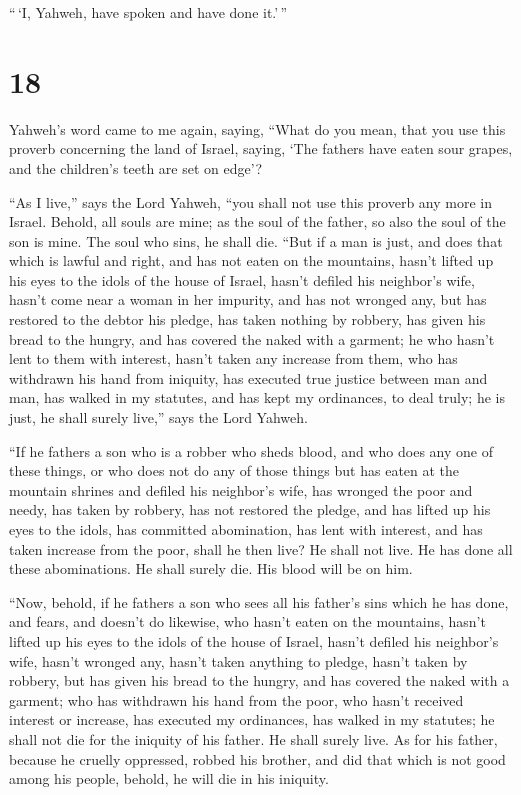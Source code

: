 ``\,`I, Yahweh, have spoken and have done it.'\,''

\hypertarget{section-17}{%
\section{18}\label{section-17}}

 Yahweh's word came to me again, saying, 
``What do you mean, that you use this proverb concerning the land of
Israel, saying, `The fathers have eaten sour grapes, and the children's
teeth are set on edge'?

 ``As I live,'' says the Lord Yahweh, ``you shall not use
this proverb any more in Israel.  Behold, all souls are
mine; as the soul of the father, so also the soul of the son is mine.
The soul who sins, he shall die.  ``But if a man is just,
and does that which is lawful and right,  and has not
eaten on the mountains, hasn't lifted up his eyes to the idols of the
house of Israel, hasn't defiled his neighbor's wife, hasn't come near a
woman in her impurity,  and has not wronged any, but has
restored to the debtor his pledge, has taken nothing by robbery, has
given his bread to the hungry, and has covered the naked with a garment;
 he who hasn't lent to them with interest, hasn't taken
any increase from them, who has withdrawn his hand from iniquity, has
executed true justice between man and man,  has walked in
my statutes, and has kept my ordinances, to deal truly; he is just, he
shall surely live,'' says the Lord Yahweh.

 ``If he fathers a son who is a robber who sheds blood,
and who does any one of these things,  or who does not do
any of those things but has eaten at the mountain shrines and defiled
his neighbor's wife,  has wronged the poor and needy, has
taken by robbery, has not restored the pledge, and has lifted up his
eyes to the idols, has committed abomination,  has lent
with interest, and has taken increase from the poor, shall he then live?
He shall not live. He has done all these abominations. He shall surely
die. His blood will be on him.

 ``Now, behold, if he fathers a son who sees all his
father's sins which he has done, and fears, and doesn't do likewise,
 who hasn't eaten on the mountains, hasn't lifted up his
eyes to the idols of the house of Israel, hasn't defiled his neighbor's
wife,  hasn't wronged any, hasn't taken anything to
pledge, hasn't taken by robbery, but has given his bread to the hungry,
and has covered the naked with a garment;  who has
withdrawn his hand from the poor, who hasn't received interest or
increase, has executed my ordinances, has walked in my statutes; he
shall not die for the iniquity of his father. He shall surely live.
 As for his father, because he cruelly oppressed, robbed
his brother, and did that which is not good among his people, behold, he
will die in his iniquity.


